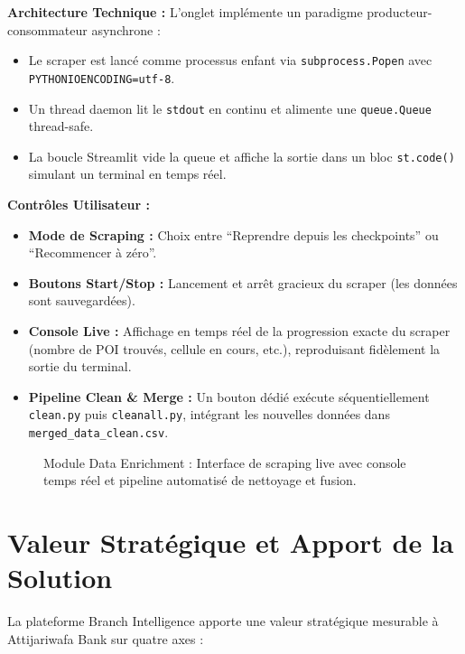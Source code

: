 \textbf{Architecture Technique :} L'onglet implémente un paradigme producteur-consommateur asynchrone :
\begin{itemize}
    \item Le scraper est lancé comme processus enfant via \texttt{subprocess.Popen} avec \texttt{PYTHONIOENCODING=utf-8}.
    \item Un thread daemon lit le \texttt{stdout} en continu et alimente une \texttt{queue.Queue} thread-safe.
    \item La boucle Streamlit vide la queue et affiche la sortie dans un bloc \texttt{st.code()} simulant un terminal en temps réel.
\end{itemize}

\textbf{Contrôles Utilisateur :}
\begin{itemize}
    \item \textbf{Mode de Scraping :} Choix entre ``Reprendre depuis les checkpoints'' ou ``Recommencer à zéro''.
    \item \textbf{Boutons Start/Stop :} Lancement et arrêt gracieux du scraper (les données sont sauvegardées).
    \item \textbf{Console Live :} Affichage en temps réel de la progression exacte du scraper (nombre de POI trouvés, cellule en cours, etc.), reproduisant fidèlement la sortie du terminal.
    \item \textbf{Pipeline Clean \& Merge :} Un bouton dédié exécute séquentiellement \texttt{clean.py} puis \texttt{cleanall.py}, intégrant les nouvelles données dans \texttt{merged\_data\_clean.csv}.
\end{itemize}

\begin{figure}[h]
    \centering
    \caption{Module Data Enrichment : Interface de scraping live avec console temps réel et pipeline automatisé de nettoyage et fusion.}
    \label{fig:screenshot_enrichment}
\end{figure}

\section{Valeur Stratégique et Apport de la Solution}

La plateforme Branch Intelligence apporte une valeur stratégique mesurable à Attijariwafa Bank sur quatre axes :

